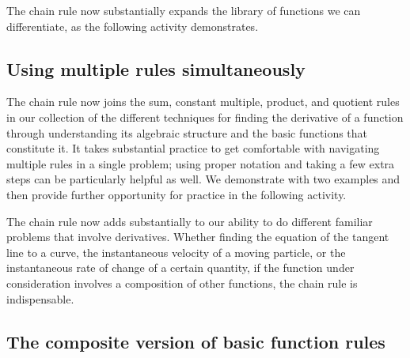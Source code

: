 
The chain rule now substantially expands the library of functions we can differentiate, as the following activity demonstrates.


\subsection*{Using multiple rules simultaneously}

The chain rule now joins the sum, constant multiple, product, and quotient rules in our collection of the different techniques for finding the derivative of a function through understanding its algebraic structure and the basic functions that constitute it.  It takes substantial practice to get comfortable with navigating multiple rules in a single problem; using proper notation and taking a few extra steps can be particularly helpful as well.  We demonstrate with two examples and then provide further opportunity for practice in the following activity.




The chain rule now adds substantially to our ability to do different familiar problems that involve derivatives.  Whether finding the equation of the tangent line to a curve, the instantaneous velocity of a moving particle, or the instantaneous rate of change of a certain quantity, if the function under consideration involves a composition of other functions, the chain rule is indispensable.


\subsection*{The composite version of basic function rules}

